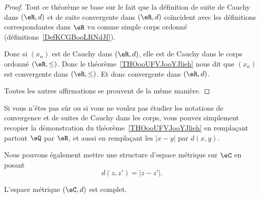 \begin{proof}
	Tout ce théorème se base sur le fait que la définition de suite de Cauchy dans \( (\eR,d)\) et de suite convergente dans \( (\eR,d)\) coïncident avec les définitions correspondantes dans \( \eR\) vu comme simple corps ordonné (définitions~\ref{DefKCGBooLRNdJf}).

	Donc si \( (x_n)\) est de Cauchy dans \( (\eR,d)\), elle est de Cauchy dans le corps ordonné \( (\eR,\leq)\). Donc le théorème~\ref{THOooUFVJooYJlieh} nous dit que \( (x_n)\) est convergente dans \( (\eR,\leq)\). Et donc convergente dans \( (\eR,d)\).

	Toutes les autres affirmations se prouvent de la même manière.
\end{proof}

Si vous n'êtes pas sûr ou si vous ne voulez pas étudier les notations de convergence et de suites de Cauchy dans les corps, vous pouvez simplement recopier la démonstration du théorème~\ref{THOooUFVJooYJlieh} en remplaçant partout \( \eQ\) par \( \eR\), et aussi en remplaçant les \( | x-y |\) par \( d(x,y)\).

\begin{normaltext}
	Nous pouvons également mettre une structure d'espace métrique sur \( \eC\) en posant
	\begin{equation}
		d(z,z')=| z-z' |.
	\end{equation}
\end{normaltext}

\begin{proposition}         \label{PROPooOIQKooPtyXgm}
	L'espace métrique \( (\eC,d)\) est complet.
\end{proposition}

